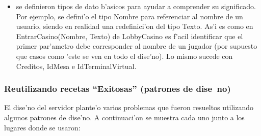 \begin{itemize}
\begin{itemize}
	\end{itemize}
\item se definieron tipos de dato b'asicos para ayudar a comprender su significado. Por ejemplo, se defini'o el tipo Nombre para referenciar al nombre de un usuario, siendo en realidad una redefinici'on del tipo Texto. As'i es como en EntrarCasino(Nombre, Texto) de LobbyCasino es f'acil identificar que el primer par'ametro debe corresponder al nombre de un jugador (por supuesto que casos como 'este se ven en todo el dise'no). Lo mismo sucede con Creditos, IdMesa e IdTerminalVirtual.
\end{itemize}



 \subsubsection{ Reutilizando recetas ``Exitosas'' (patrones de dise~no)}

El dise'no del servidor plante'o varios problemas que fueron resueltos utilizando algunos patrones de dise'no. A continuaci'on se muestra cada uno junto a los lugares donde se usaron:

